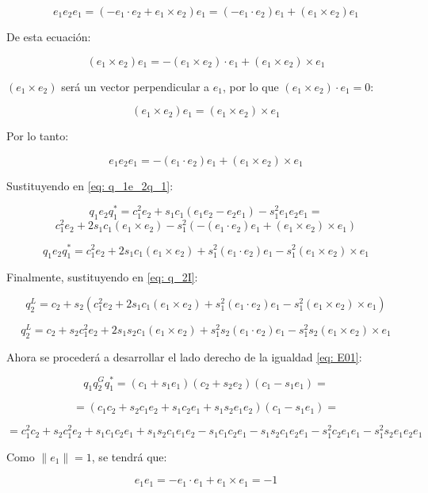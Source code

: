 \documentclass[12pt, a4paper]{report}
\begin{document}
$$ e_1 e_2 e_1 = (-e_1 \cdot e_2 + e_1 \times e_2)e_1 =(-e_1 \cdot e_2)e_1 + (e_1 \times e_2)e_1 $$

De esta ecuación:

$$ (e_1 \times e_2)e_1 = -(e_1 \times e_2) \cdot e_1 + (e_1 \times e_2) \times e_1 $$

$(e_1 \times e_2)$ será un vector perpendicular a $e_1$, por lo que $(e_1 \times e_2) \cdot e_1 = 0$:

$$ (e_1 \times e_2)e_1 = (e_1 \times e_2) \times e_1 $$

Por lo tanto:

\begin{equation} \label{eq: e_1e_2e_1}
e_1 e_2 e_1 = -(e_1 \cdot e_2)e_1 + (e_1 \times e_2) \times e_1
\end{equation}

Sustituyendo en \eqref{eq: q_1e_2q_1}:

$$ q_1e_2q_1^* = c_1^2e_2 + s_1c_1(e_1e_2 - e_2e_1) - s_1^2e_1e_2e_1 = $$
$$ c_1^2e_2 + 2s_1c_1(e_1 \times e_2) - s_1^2(-(e_1 \cdot e_2)e_1 + (e_1 \times e_2) \times e_1) $$

\begin{equation}
q_1e_2q_1^* = c_1^2e_2 + 2s_1c_1(e_1 \times e_2) + s_1^2(e_1 \cdot e_2)e_1 - s_1^2(e_1 \times e_2) \times e_1
\end{equation}

Finalmente, sustituyendo en \eqref{eq: q_2I}:

$$ q_2^L = c_2 + s_2(c_1^2e_2 + 2s_1c_1(e_1 \times e_2) + s_1^2(e_1 \cdot e_2)e_1 - s_1^2(e_1 \times e_2) \times e_1) $$

\begin{equation} \label{eq: E02}
q_2^L = c_2 + s_2c_1^2e_2 + 2s_1s_2c_1(e_1 \times e_2) + s_1^2s_2(e_1 \cdot e_2)e_1 - s_1^2s_2(e_1 \times e_2) \times e_1
\end{equation}

Ahora se procederá a desarrollar el lado derecho de la igualdad \eqref{eq: E01}:

$$ q_1q_2^Gq_1^* = (c_1 + s_1 e_1)(c_2 + s_2 e_2)(c_1 - s_1 e_1) = $$

$$ = (c_1c_2 + s_2c_1e_2 + s_1c_2e_1 + s_1s_2e_1e_2)(c_1 - s_1 e_1) = $$

$$ = c_1^2c_2 + s_2c_1^2e_2 + s_1c_1c_2e_1 + s_1s_2c_1e_1e_2 - s_1c_1c_2e_1 - s_1s_2c_1e_2e_1 - s_1^2c_2e_1e_1 - s_1^2s_2e_1e_2e_1 $$

Como $\|e_1\| = 1$, se tendrá que:

\begin{equation}
e_1e_1 = -e_1 \cdot e_1 + e_1 \times e_1 = -1
\end{equation}
\end{document}
